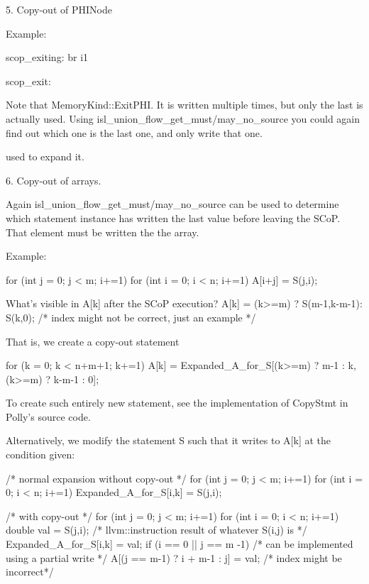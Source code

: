 5. Copy-out of PHINode

Example:

scop_exiting:
  br i1 %

scop_exit:

Note that %
MemoryKind::ExitPHI. It is written multiple times, but only the last
is actually used.
Using isl_union_flow_get_{must/may}_no_source you could again find out
which one is the last one, and only write that one.

used to expand it.


6. Copy-out of arrays.

Again isl_union_flow_get_{must/may}_no_source can be used to determine
which statement instance has written the last value before leaving the
SCoP.  That element must be written the the array.

Example:

for (int j = 0; j < m; i+=1)
  for (int i = 0; i < n; i+=1)
    A[i+j] = S(j,i);


What's visible in A[k] after the SCoP execution?
A[k] = (k>=m) ? S(m-1,k-m-1): S(k,0); /* index might not be correct,
just an example */

That is, we create a copy-out statement

for (k = 0; k < n+m+1; k+=1)
  A[k] = Expanded_A_for_S[(k>=m) ? m-1 : k,(k>=m) ? k-m-1 : 0];

To create such entirely new statement, see the implementation of
CopyStmt in Polly's source code.

Alternatively, we modify the statement S such that it writes to A[k]
at the condition given:

/* normal expansion without copy-out */
for (int j = 0; j < m; i+=1)
  for (int i = 0; i < n; i+=1)
    Expanded_A_for_S[i,k] = S(j,i);

/* with copy-out */
for (int j = 0; j < m; i+=1)
  for (int i = 0; i < n; i+=1) {
    double val = S(j,i); /* llvm::instruction result of whatever S(i,j) is */
    Expanded_A_for_S[i,k] = val;
    if (i == 0 || j == m -1) /* can be implemented  using a partial write */
       A[(j == m-1) ? i + m-1 : j] = val; /* index might be incorrect*/
}
